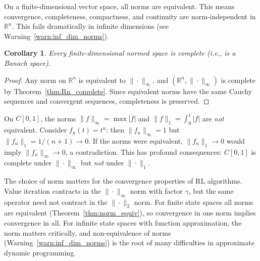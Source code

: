 \documentclass[11pt,a4paper]{article}
\theoremstyle{definition}
\theoremstyle{plain}
\newtheorem{corollary}[theorem]{Corollary}
\theoremstyle{remark}
\newcommand{\R}{\mathbb{R}}
\begin{document}
\begin{keyresult}
On a finite-dimensional vector space, all norms are equivalent. This means
convergence, completeness, compactness, and continuity are norm-independent in
$\R^n$. This fails dramatically in infinite dimensions (see
Warning~\ref{warn:inf_dim_norms}).
\end{keyresult}

\begin{corollary}
\label{cor:finite_dim_complete}
Every finite-dimensional normed space is complete (i.e., is a Banach space).
\end{corollary}

\begin{proof}
Any norm on $\R^n$ is equivalent to $\|\cdot\|_\infty$, and $(\R^n, \|\cdot\|_\infty)$
is complete by Theorem~\ref{thm:Rn_complete}. Since equivalent norms have the
same Cauchy sequences and convergent sequences, completeness is preserved.
\end{proof}

\begin{warning}
\label{warn:inf_dim_norms}
On $C[0,1]$, the norms $\|f\|_\infty = \max |f|$ and $\|f\|_1 = \int_0^1 |f|$
are \emph{not} equivalent. Consider $f_n(t) = t^n$: then $\|f_n\|_\infty = 1$ but
$\|f_n\|_1 = 1/(n+1) \to 0$. If the norms were equivalent, $\|f_n\|_1 \to 0$
would imply $\|f_n\|_\infty \to 0$, a contradiction. This has profound consequences:
$C[0,1]$ is complete under $\|\cdot\|_\infty$ but \emph{not} under $\|\cdot\|_1$.
\end{warning}

\begin{rlconnection}
The choice of norm matters for the convergence properties of RL algorithms.
Value iteration contracts in the $\|\cdot\|_\infty$ norm with factor $\gamma$,
but the same operator need not contract in the $\|\cdot\|_2$ norm. For finite
state spaces all norms are equivalent (Theorem~\ref{thm:norm_equiv}), so
convergence in one norm implies convergence in all. For infinite state spaces
with function approximation, the norm matters critically, and
non-equivalence of norms (Warning~\ref{warn:inf_dim_norms}) is the root of
many difficulties in approximate dynamic programming.
\end{rlconnection}

\end{document}
